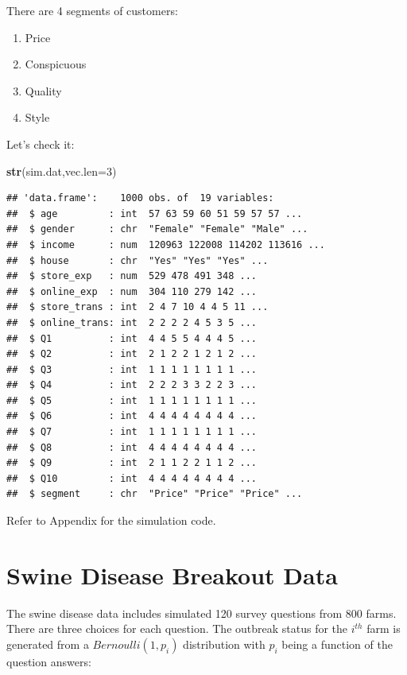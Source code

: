 \documentclass[12pt,]{krantz}
\makeatletter
\newenvironment{Shaded}{\begin{snugshade}}{\end{snugshade}}
\newcommand{\DataTypeTok}[1]{\textcolor[rgb]{0.27,0.27,0.27}{#1}}
\newcommand{\DecValTok}[1]{\textcolor[rgb]{0.06,0.06,0.06}{#1}}
\newcommand{\KeywordTok}[1]{\textcolor[rgb]{0.27,0.27,0.27}{\textbf{#1}}}
\newcommand{\NormalTok}[1]{#1}
\providecommand{\tightlist}{%
  \setlength{\itemsep}{0pt}\setlength{\parskip}{0pt}}
\newenvironment{kframe}{%
\medskip{}
\setlength{\fboxsep}{.8em}
 \def\at@end@of@kframe{}%
 \ifinner\ifhmode%
  \def\at@end@of@kframe{\end{minipage}}%
  \begin{minipage}{\columnwidth}%
 \fi\fi%
 \def\FrameCommand##1{\hskip\@totalleftmargin \hskip-\fboxsep
 \colorbox{shadecolor}{##1}\hskip-\fboxsep
     \hskip-\linewidth \hskip-\@totalleftmargin \hskip\columnwidth}%
 \MakeFramed {\advance\hsize-\width
   \@totalleftmargin\z@ \linewidth\hsize
   \@setminipage}}%
 {\par\unskip\endMakeFramed%
 \at@end@of@kframe}
\renewenvironment{Shaded}{\begin{kframe}}{\end{kframe}}
\makeatother
\begin{document}
There are 4 segments of customers:

\begin{enumerate}
\def\labelenumi{\arabic{enumi}.}
\tightlist
\item
  Price
\item
  Conspicuous
\item
  Quality
\item
  Style
\end{enumerate}

Let's check it:

\begin{Shaded}
\begin{Highlighting}[]
\KeywordTok{str}\NormalTok{(sim.dat,}\DataTypeTok{vec.len=}\DecValTok{3}\NormalTok{)}
\end{Highlighting}
\end{Shaded}

\begin{verbatim}
## 'data.frame':	1000 obs. of  19 variables:
##  $ age         : int  57 63 59 60 51 59 57 57 ...
##  $ gender      : chr  "Female" "Female" "Male" ...
##  $ income      : num  120963 122008 114202 113616 ...
##  $ house       : chr  "Yes" "Yes" "Yes" ...
##  $ store_exp   : num  529 478 491 348 ...
##  $ online_exp  : num  304 110 279 142 ...
##  $ store_trans : int  2 4 7 10 4 4 5 11 ...
##  $ online_trans: int  2 2 2 2 4 5 3 5 ...
##  $ Q1          : int  4 4 5 5 4 4 4 5 ...
##  $ Q2          : int  2 1 2 2 1 2 1 2 ...
##  $ Q3          : int  1 1 1 1 1 1 1 1 ...
##  $ Q4          : int  2 2 2 3 3 2 2 3 ...
##  $ Q5          : int  1 1 1 1 1 1 1 1 ...
##  $ Q6          : int  4 4 4 4 4 4 4 4 ...
##  $ Q7          : int  1 1 1 1 1 1 1 1 ...
##  $ Q8          : int  4 4 4 4 4 4 4 4 ...
##  $ Q9          : int  2 1 1 2 2 1 1 2 ...
##  $ Q10         : int  4 4 4 4 4 4 4 4 ...
##  $ segment     : chr  "Price" "Price" "Price" ...
\end{verbatim}

Refer to Appendix for the simulation code.

\hypertarget{swinediseasedata}{%
\section{Swine Disease Breakout Data}\label{swinediseasedata}}

The swine disease data includes simulated 120 survey questions from 800 farms. There are three choices for each question. The outbreak status for the \(i^{th}\) farm is generated from a \(Bernoulli(1, p_i)\) distribution with \(p_i\) being a function of the question answers:
\end{document}
